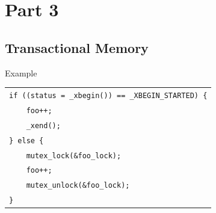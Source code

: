 \documentclass[xcolor=dvipsnames]{beamer}
\begin{document}

\section{Part 3}
\subsection{Transactional Memory}
\newcommand\xbegin{\texttt{\_xbegin()}\xspace}
\newcommand\xend{\texttt{\_xend()}\xspace}
\newcommand\xabort{\texttt{\_xabort()}\xspace}


\begin{frame}{Example}
	\begin{center}
		\begin{tabular}{l}
			\texttt{if ((status = \_xbegin()) == \_XBEGIN\_STARTED) \{} \\
			\texttt{~~~~foo++;} \\
			\texttt{~~~~\_xend();} \\
			\texttt{\} else \{}\\ %
			\texttt{~~~~mutex\_lock(\&foo\_lock);} \\
			\texttt{~~~~foo++;} \\
			\texttt{~~~~mutex\_unlock(\&foo\_lock);} \\
			\texttt{\}} \\
		\end{tabular}
	\end{center}
\end{frame}
\end{document}
